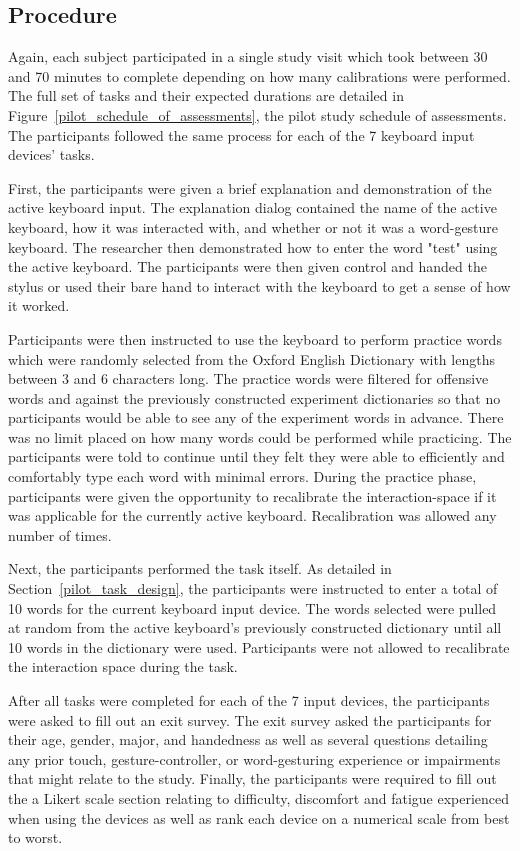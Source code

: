 \subsection{Procedure} \label{pilot_procedure}
Again, each subject participated in a single study visit which took between 30 and 70 minutes to complete depending on how many calibrations were performed. The full set of tasks and their expected durations are detailed in Figure~\ref{pilot_schedule_of_assessments}, the pilot study schedule of assessments. The participants followed the same process for each of the 7 keyboard input devices' tasks.

First, the participants were given a brief explanation and demonstration of the active keyboard input. The explanation dialog contained the name of the active keyboard, how it was interacted with, and whether or not it was a word-gesture keyboard. The researcher then demonstrated how to enter the word "test" using the active keyboard. The participants were then given control and handed the stylus or used their bare hand to interact with the keyboard to get a sense of how it worked.

Participants were then instructed to use the keyboard to perform practice words which were randomly selected from the Oxford English Dictionary with lengths between 3 and 6 characters long. The practice words were filtered for offensive words and against the previously constructed experiment dictionaries so that no participants would be able to see any of the experiment words in advance. There was no limit placed on how many words could be performed while practicing. The participants were told to continue until they felt they were able to efficiently and comfortably type each word with minimal errors. During the practice phase, participants were given the opportunity to recalibrate the interaction-space if it was applicable for the currently active keyboard. Recalibration was allowed any number of times.

Next, the participants performed the task itself. As detailed in Section~\ref{pilot_task_design}, the participants were instructed to enter a total of 10 words for the current keyboard input device. The words selected were pulled at random from the active keyboard's previously constructed dictionary until all 10 words in the dictionary were used. Participants were not allowed to recalibrate the interaction space during the task. 

After all tasks were completed for each of the 7 input devices, the participants were asked to fill out an exit survey. The exit survey asked the participants for their age, gender, major, and handedness as well as several questions detailing any prior touch, gesture-controller, or word-gesturing experience or impairments that might relate to the study. Finally, the participants were required to fill out the a Likert scale section relating to difficulty, discomfort and fatigue experienced when using the devices as well as rank each device on a numerical scale from best to worst.

